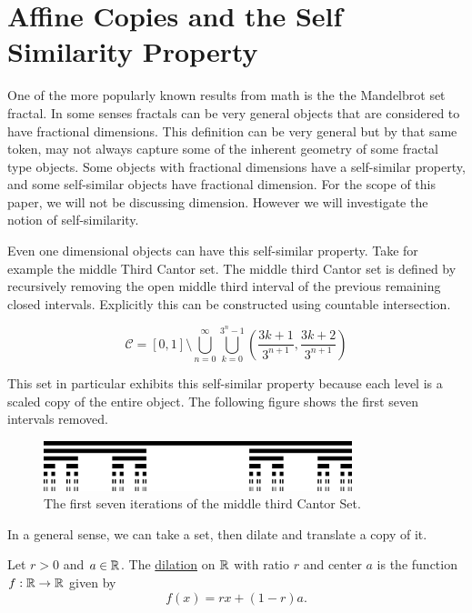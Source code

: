 \section{Affine Copies and the Self Similarity Property}

One of the more popularly known results from math is the the Mandelbrot set fractal.  In some senses fractals can be very general objects that are considered to have fractional dimensions.  This definition can be very general but by that same token, may not always capture some of the inherent geometry of some fractal type objects. Some objects with fractional dimensions have a self-similar property, and some self-similar objects have fractional dimension.  For the scope of this paper, we will not be discussing dimension. However we will investigate the notion of self-similarity. 


Even one dimensional objects can have this self-similar property. Take for example the middle Third Cantor set.  The middle third Cantor set is defined by recursively removing the open middle third interval of the previous remaining closed intervals.  Explicitly this can be constructed using countable intersection.  

\begin{example}\label{middleThirdCantor}
    $$\mathcal{C} = [0,1] \setminus \bigcup_{n=0}^\infty\bigcup_{k=0}^{3^n-1}\left(\frac{3k+1}{3^{n+1}},\frac{3k+2}{3^{n+1}}\right)$$
\end{example}

This set in particular exhibits this self-similar property because each level is a scaled copy of the entire object.  The following figure shows the first seven intervals removed.  

\begin{figure}[h]
    \includegraphics[width=0.8\textwidth]{Content/Images/Cantor_set_in_seven_iterations.jpg}
    \centering
    \caption{The first seven iterations of the middle third Cantor Set.}
\end{figure}
In a general sense, we can take a set, then dilate and translate a copy of it. 

\begin{definition}[Dilation]\cite{GEdgar}
    Let $r>0$ and $a \in \mathbb{R}$.  The \underline{dilation} on $\mathbb{R}$ with ratio $r$ and center $a$ is the function $f: \mathbb{R} \to \mathbb{R}$ given by $$f(x)= rx + (1-r) a.$$
\end{definition}

